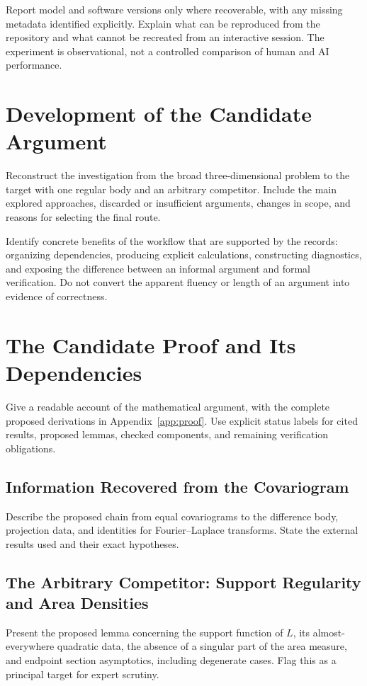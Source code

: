 \documentclass[11pt,a4paper]{article}
\begin{document}
Report model and software versions only where recoverable, with any missing
metadata identified explicitly. Explain what can be reproduced from the
repository and what cannot be recreated from an interactive session. The
experiment is observational, not a controlled comparison of human and AI
performance.

\section{Development of the Candidate Argument}
Reconstruct the investigation from the broad three-dimensional problem to
the target with one regular body and an arbitrary competitor. Include the
main explored approaches, discarded or insufficient arguments, changes in
scope, and reasons for selecting the final route.

Identify concrete benefits of the workflow that are supported by the records:
organizing dependencies, producing explicit calculations, constructing
diagnostics, and exposing the difference between an informal argument and
formal verification. Do not convert the apparent fluency or length of an
argument into evidence of correctness.

\section{The Candidate Proof and Its Dependencies}
Give a readable account of the mathematical argument, with the complete
proposed derivations in Appendix~\ref{app:proof}. Use explicit status labels
for cited results, proposed lemmas, checked components, and remaining
verification obligations.

\subsection{Information Recovered from the Covariogram}
Describe the proposed chain from equal covariograms to the difference body,
projection data, and identities for Fourier--Laplace transforms. State the
external results used and their exact hypotheses.

\subsection{The Arbitrary Competitor: Support Regularity and Area Densities}
Present the proposed lemma concerning the support function of $L$, its
almost-everywhere quadratic data, the absence of a singular part of the area
measure, and endpoint section asymptotics, including degenerate cases.
Flag this as a principal target for expert scrutiny.
\end{document}
